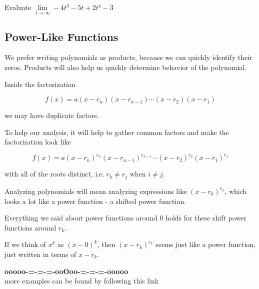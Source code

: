 \documentclass{ximera}
\begin{document}
\begin{question}

Evaluate $\lim\limits_{t \to \infty} -4 t^3 - 5 t + 2 t^4  - 3$


\begin{multipleChoice}
\choice [correct]{$-\infty$}
\choice {$\infty$}
\end{multipleChoice}

\end{question}










\subsection*{Power-Like Functions}

We prefer writing polynomials as products, because we can quickly identify their zeros.  Products will also help us quickly determine behavior of the polynomial.

Inside the factorization

\[   f(x) = a (x-r_n)(x-r_{n-1})  \cdots (x-r_2)(x-r_1)  \]

we may have duplicate factors.

To help our analysis, it will help to gather common factors and make the factorization look like

\[   f(x) = a (x-r_n)^{e_n}(x-r_{n-1})^{e_{n-1}}  \cdots (x-r_2)^{e_2}(x-r_1)^{e_1}  \]

with all of the roots distinct, i.e. $r_k \ne r_j$ when $i \ne j$.



Analyzing polynomials will mean analyzing expressions like $(x-r_k)^{e_k}$, which looks a lot like a power function - a shifted power function.

Everything we said about power functions around $0$ holds for these shift power functions around $r_k$. 


If we think of $x^k$ as $(x-0)^k$, then $(x-r_k)^{e_k}$ seems just like a power function, just written in terms of $x-r_k$.















\begin{center}
\textbf{\textcolor{green!50!black}{ooooo-=-=-=-ooOoo-=-=-=-ooooo}} \\

more examples can be found by following this link\\ 

\end{center}
\end{document}
